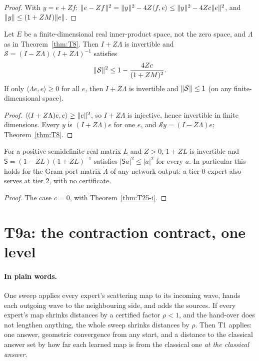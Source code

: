\begin{proof}
  \leanok
  With $y=e+Zf$: $\lVert e-Zf\rVert^2=\lVert y\rVert^2-4Z\langle f,e\rangle
  \le\lVert y\rVert^2-4Zc\lVert e\rVert^2$, and $\lVert y\rVert\le(1+ZM)\lVert e\rVert$.
\end{proof}

\begin{theorem}\label{thm:T8-cayley}
  \leanok
  Let $E$ be a finite-dimensional real inner-product space, not the zero
  space, and $\Lambda$ as in Theorem~\ref{thm:T8}.  Then $I+Z\Lambda$ is
  invertible and $\mathcal S=(I-Z\Lambda)(I+Z\Lambda)^{-1}$ satisfies
  \[
    \lVert \mathcal S\rVert^2\le1-\frac{4Zc}{(1+ZM)^2}.
  \]
  If only $\langle\Lambda e,e\rangle\ge0$ for all $e$, then $I+Z\Lambda$ is
  invertible and $\lVert \mathcal S\rVert\le1$ (on any finite-dimensional space).
\end{theorem}

\begin{proof}
  \leanok
  $\langle(I+Z\Lambda)e,e\rangle\ge\lVert e\rVert^2$, so $I+Z\Lambda$ is injective,
  hence invertible in finite dimensions.  Every $y$ is $(I+Z\Lambda)e$ for one
  $e$, and $\mathcal Sy=(I-Z\Lambda)e$; Theorem~\ref{thm:T8}.
\end{proof}

\begin{corollary}[T8 at tier 0]\label{cor:T8-gram}
  \leanok
  For a positive semidefinite real matrix $L$ and $Z>0$, $1+ZL$ is invertible
  and $\mathsf S=(1-ZL)(1+ZL)^{-1}$ satisfies $|\mathsf Sa|^2\le|a|^2$ for
  every $a$.  In particular this holds for the Gram port matrix
  $\tilde\Lambda$ of any network output: a tier-0 expert also serves at
  tier 2, with no certificate.
\end{corollary}

\begin{proof}
  \leanok
  The case $c=0$, with Theorem~\ref{thm:T25-i}.
\end{proof}

\section{T9a: the contraction contract, one level}

\paragraph{In plain words.}
One sweep applies every expert's scattering map to its incoming wave, hands
each outgoing wave to the neighbouring side, and adds the sources.  If every
expert's map shrinks distances by a certified factor $\rho<1$, and the
hand-over does not lengthen anything, the whole sweep shrinks distances by
$\rho$.  Then T1 applies: one answer, geometric convergence from any start,
and a distance to the classical answer set by how far each learned map is from
the classical one \emph{at the classical answer}.

